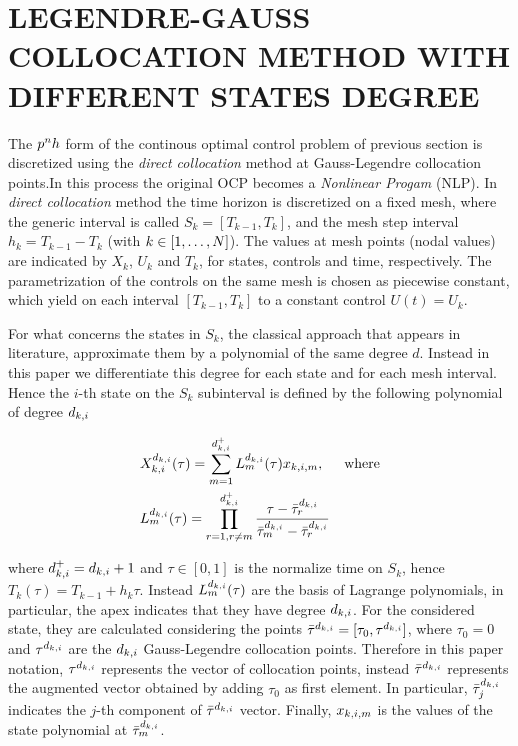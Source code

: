 \section*{LEGENDRE-GAUSS COLLOCATION METHOD WITH DIFFERENT STATES DEGREE}
The $p^{n}h$ form of the continous optimal control problem of previous section is discretized using the \emph{direct collocation} method at Gauss-Legendre collocation points.In this process the original OCP becomes a \emph{Nonlinear Progam} (NLP). In \emph{direct collocation} method the time horizon is discretized on a fixed mesh, where the generic interval is called $S_{k} = [T_{k-1}, T_{k}]$, and the mesh step interval $h_{k} = T_{k-1} - T_{k}$ (with $k \in [1,\dots,N]$). The values at mesh points (nodal values) are indicated by $X_{k}$, $U_{k}$ and $T_{k}$, for  states, controls and time, respectively.
The parametrization of the controls on the same mesh is chosen as piecewise constant, which yield on each interval $[T_{k-1}, T_{k}]$ to a constant control $U(t) = U_{k}$.

For what concerns the states in $S_{k}$, the classical approach that appears in literature, approximate them by a polynomial of the same degree $d$.
Instead in this paper we differentiate this degree for each state and for each mesh interval. Hence the $i$-th state on the $S_{k}$ subinterval is defined by the following polynomial of degree $d_{k,i}$

\begin{subequations}
	\begin{align}
	&X_{k,i}^{d_{k,i}} (\tau) = \sum_{m=1}^{d_{k,i}^{+}} L_{m}^{d_{k,i}}(\tau)x_{k,i,m}, \hspace{5mm} \text{where} \label{Xpoly}\\
	&L_{m}^{d_{k,i}} (\tau) = \prod_{r=1, r\neq m}^{d_{k,i}^{+}} \dfrac{\tau - \bar{\tau}^{d_{k,i}}_{r}}{\bar{\tau}^{d_{k,i}}_{m} - \bar{\tau}^{d_{k,i}}_{r}} \label{BLagrange}
	\end{align}
\end{subequations}

where $d_{k,i}^{+} = d_{k,i} + 1$ and $\tau \in [0,1]$ is the normalize time on $S_k$, hence $T_k(\tau) = T_{k-1} + h_k\tau$.
Instead $L_{m}^{d_{k,i}} (\tau)$ are the basis of Lagrange polynomials, in particular, the apex indicates that they have degree $d_{k,i}$. For the considered state, they are calculated considering the points $\bar{\tau}^{d_{k,i}} = [\tau_{0}, \tau^{d_{k,i}}]$, where $\tau_{0} = 0$ and $\tau^{d_{k,i}}$ are the $d_{k,i}$ Gauss-Legendre collocation points. Therefore in this paper notation, $\tau^{d_{k,i}}$  represents the vector of collocation points, instead $\bar{\tau}^{d_{k,i}}$ represents the augmented vector obtained by adding $\tau_{0}$ as first element.
In particular, $\bar{\tau}^{d_{k,i}}_{j}$ indicates the $j$-th component of $\bar{\tau}^{d_{k,i}}$ vector.
Finally, $x_{k,i,m}$ is the values of the state polynomial at $\bar{\tau}^{d_{k,i}}_{m}$.


